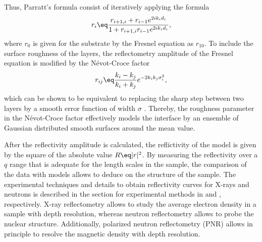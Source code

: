 \documentclass[\main/dresen_thesis.tex]{subfiles}
\begin{document}
    Thus, Parratt's formula consist of iteratively applying the formula
    \begin{align}
      r_{i} \eq \frac{r_{i+1,i} + r_{i-1} e^{2 i k_i d_i}} {1 + r_{i+1,i} r_{i-1} e^{2 i k_i d_i}},
    \end{align}
    where $r_0$ is given for the substrate by the Fresnel equation as $r_{10}$.
    To include the surface roughness of the layers, the reflectometry amplitude of the Fresnel equation is modified by the Névot-Croce factor \cite{Nevot_1980_Carac}
    \begin{align}
      r_{ij} \eq \frac{k_i - k_j}{k_i+k_j} e^{-2 k_i k_j \sigma_i^2},\\
    \end{align}
    which can be shown to be equivalent to replacing the sharp step between two layers by a smooth error function of width $\sigma$ \cite{Tolan_1999_XRaySc}.
    Thereby, the roughness parameter in the Névot-Croce factor effectively models the interface by an ensemble of Gaussian distributed smooth surfaces around the mean value.

    After the reflectivity amplitude is calculated, the reflictivity of the model is given by the square of the absolute value $R \eq |r|^2$.
    By measuring the reflectivity over a $q$ range that is adequate for the length scales in the sample, the comparison of the data with models allows to deduce on the structure of the sample.
    The experimental techniques and details to obtain reflectivity curves for X-rays and neutrons is described in the section for experimental methods in  and , respectively.
    X-ray reflectometry allows to study the average electron density in a sample with depth resolution, whereas neutron reflectometry allows to probe the nuclear structure.
    Additionally, polarized neutron reflectometry (PNR) allows in principle to resolve the magnetic density with depth resolution.
\end{document}
